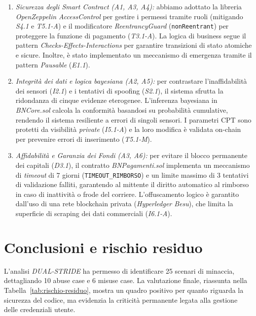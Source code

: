 \begin{enumerate}
    \item \textit{Sicurezza degli Smart Contract (A1, A3, A4):}
    abbiamo adottato la libreria \textit{OpenZeppelin AccessControl} per gestire i permessi tramite ruoli (mitigando \textit{S4.1} e \textit{T5.1-A}) e il modificatore \textit{ReentrancyGuard} (\texttt{nonReentrant}) per proteggere la funzione di pagamento (\textit{T3.1-A}). La logica di business segue il pattern \textit{Checks-Effects-Interactions} per garantire transizioni di stato atomiche e sicure. Inoltre, è stato implementato un meccanismo di emergenza tramite il pattern \textit{Pausable} (\textit{E1.1}).

    \item \textit{Integrità dei dati e logica bayesiana (A2, A5):}
    per contrastare l'inaffidabilità dei sensori (\textit{I2.1}) e i tentativi di spoofing (\textit{S2.1}), il sistema sfrutta la ridondanza di cinque evidenze eterogenee. L'inferenza bayesiana in \textit{BNCore.sol} calcola la conformità basandosi su probabilità cumulative, rendendo il sistema resiliente a errori di singoli sensori. I parametri CPT sono protetti da visibilità \textit{private} (\textit{I5.1-A}) e la loro modifica è validata on-chain per prevenire errori di inserimento (\textit{T5.1-M}).

    \item \textit{Affidabilità e Garanzia dei Fondi (A3, A6):}
    per evitare il blocco permanente dei capitali (\textit{D3.1}), il contratto \textit{BNPagamenti.sol} implementa un meccanismo di \textit{timeout} di 7 giorni (\texttt{TIMEOUT\_RIMBORSO}) e un limite massimo di 3 tentativi di validazione falliti, garantendo al mittente il diritto automatico al rimborso in caso di inattività o frode del corriere. L'offuscamento logico è garantito dall'uso di una rete blockchain privata (\textit{Hyperledger Besu}), che limita la superficie di scraping dei dati commerciali (\textit{I6.1-A}).
\end{enumerate}

\section{Conclusioni e rischio residuo}
L'analisi \textit{DUAL-STRIDE} ha permesso di identificare 25 scenari di minaccia, dettagliando 10 abuse case e 6 misuse case.
La valutazione finale, riassunta nella Tabella~\ref{tab:rischio-residuo}, mostra un quadro positivo per quanto riguarda la sicurezza del codice, ma evidenzia la criticità permanente legata alla gestione delle credenziali utente.

